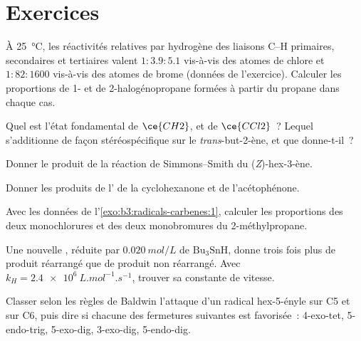 \section{Exercices}

\begin{exercise}[$\star$]\label{exo:b3:radicals-carbenes:1}
À \qty{25}{\celsius}, les réactivités relatives par hydrogène des liaisons C--H primaires, secondaires et
tertiaires valent $1 : 3.9 : 5.1$ vis-à-vis des atomes de chlore et $1 : 82 : 1600$ vis-à-vis des
atomes de brome (données de l'exercice). Calculer les proportions de 1- et
de 2-halogénopropane formées à partir du propane dans chaque cas.
\end{exercise}

\begin{exercise}[$\star$]\label{exo:b3:radicals-carbenes:2}
Quel est l'état fondamental de $\ce{CH2}$, et de $\ce{CCl2}$~? Lequel s'additionne de façon stéréospécifique sur le
\textit{trans}-but-2-ène, et que donne-t-il~?
\end{exercise}

\begin{exercise}[$\star$]\label{exo:b3:radicals-carbenes:3}
Donner le produit de la réaction de Simmons--Smith du (\textit{Z})-hex-3-ène.
\end{exercise}

\begin{exercise}[$\star$]\label{exo:b3:radicals-carbenes:4}
Donner les produits de l' de la cyclohexanone
et de l'acétophénone.
\end{exercise}

\begin{exercise}[$\star\star$]\label{exo:b3:radicals-carbenes:5}
Avec les données de l'\cref{exo:b3:radicals-carbenes:1}, calculer les
proportions des deux monochlorures et des deux monobromures du
2-méthylpropane.
\end{exercise}

\begin{exercise}[$\star\star$]\label{exo:b3:radicals-carbenes:6}
Une nouvelle , réduite par $\qty{0.020}{mol/L}$ de $\mathrm{Bu_3SnH}$, donne trois fois plus de produit réarrangé
que de produit non réarrangé. Avec $k_H = \qty{2.4e6}{L.mol^{-1}.s^{-1}}$, trouver sa constante de vitesse.
\end{exercise}

\begin{exercise}[$\star\star$]\label{exo:b3:radicals-carbenes:7}
Classer selon les règles de Baldwin l'attaque d'un radical hex-5-ényle sur
C5 et sur C6, puis dire si chacune des fermetures suivantes est
favorisée~: 4-exo-tet, 5-endo-trig, 5-exo-dig, 3-exo-dig, 5-endo-dig.
\end{exercise}


